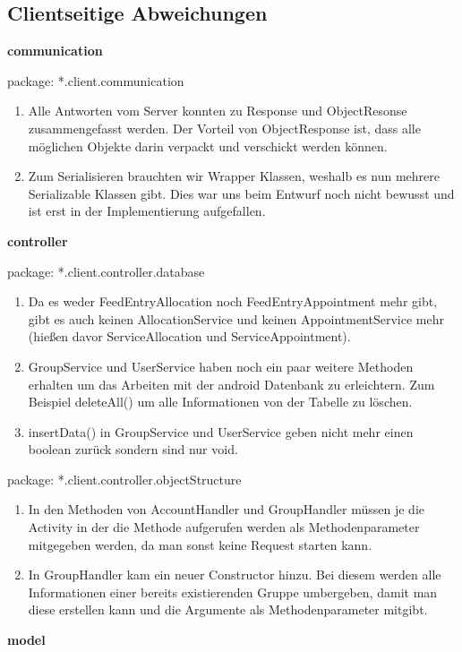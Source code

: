 
\subsection{Clientseitige Abweichungen}

\textbf{communication}

package: *.client.communication
\begin{enumerate}
	\item Alle Antworten vom Server konnten zu Response und ObjectResonse zusammengefasst werden. Der Vorteil von ObjectResponse ist, dass alle möglichen Objekte darin verpackt und verschickt werden können.
	\item Zum Serialisieren brauchten wir Wrapper Klassen, weshalb es nun mehrere Serializable Klassen gibt. Dies war uns beim Entwurf noch nicht bewusst und ist erst in der Implementierung aufgefallen.
\end{enumerate}


\textbf{controller}

package: *.client.controller.database
\begin{enumerate}
	\item Da es weder FeedEntryAllocation noch FeedEntryAppointment mehr gibt, gibt es auch keinen AllocationService und keinen AppointmentService mehr (hießen davor ServiceAllocation und ServiceAppointment).
	\item GroupService und UserService haben noch ein paar weitere Methoden erhalten um das Arbeiten mit der android Datenbank zu erleichtern. Zum Beispiel deleteAll() um alle Informationen von der Tabelle zu löschen.
	\item insertData() in GroupService und UserService geben nicht mehr einen boolean zurück sondern sind nur void.
\end{enumerate}

package: *.client.controller.objectStructure
\begin{enumerate}
	\item In den Methoden von AccountHandler und GroupHandler müssen je die Activity in der die Methode aufgerufen werden als Methodenparameter mitgegeben werden, da man sonst keine Request starten kann.
	\item In GroupHandler kam ein neuer Constructor hinzu. Bei diesem werden alle Informationen einer bereits existierenden Gruppe umbergeben, damit man diese erstellen kann und die Argumente als Methodenparameter mitgibt.
\end{enumerate}


\textbf{model}

